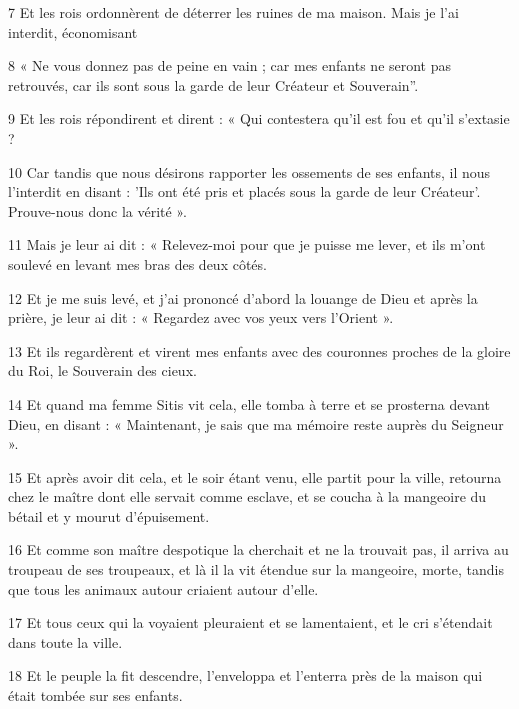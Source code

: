 \par 7 Et les rois ordonnèrent de déterrer les ruines de ma maison. Mais je l'ai interdit, économisant

\par 8 « Ne vous donnez pas de peine en vain ; car mes enfants ne seront pas retrouvés, car ils sont sous la garde de leur Créateur et Souverain''.

\par 9 Et les rois répondirent et dirent : « Qui contestera qu'il est fou et qu'il s'extasie ?

\par 10 Car tandis que nous désirons rapporter les ossements de ses enfants, il nous l'interdit en disant : 'Ils ont été pris et placés sous la garde de leur Créateur'. Prouve-nous donc la vérité ».

\par 11 Mais je leur ai dit : « Relevez-moi pour que je puisse me lever, et ils m'ont soulevé en levant mes bras des deux côtés.

\par 12 Et je me suis levé, et j'ai prononcé d'abord la louange de Dieu et après la prière, je leur ai dit : « Regardez avec vos yeux vers l'Orient ».

\par 13 Et ils regardèrent et virent mes enfants avec des couronnes proches de la gloire du Roi, le Souverain des cieux.

\par 14 Et quand ma femme Sitis vit cela, elle tomba à terre et se prosterna devant Dieu, en disant : « Maintenant, je sais que ma mémoire reste auprès du Seigneur ».

\par 15 Et après avoir dit cela, et le soir étant venu, elle partit pour la ville, retourna chez le maître dont elle servait comme esclave, et se coucha à la mangeoire du bétail et y mourut d'épuisement.

\par 16 Et comme son maître despotique la cherchait et ne la trouvait pas, il arriva au troupeau de ses troupeaux, et là il la vit étendue sur la mangeoire, morte, tandis que tous les animaux autour criaient autour d'elle.

\par 17 Et tous ceux qui la voyaient pleuraient et se lamentaient, et le cri s'étendait dans toute la ville.

\par 18 Et le peuple la fit descendre, l'enveloppa et l'enterra près de la maison qui était tombée sur ses enfants.

